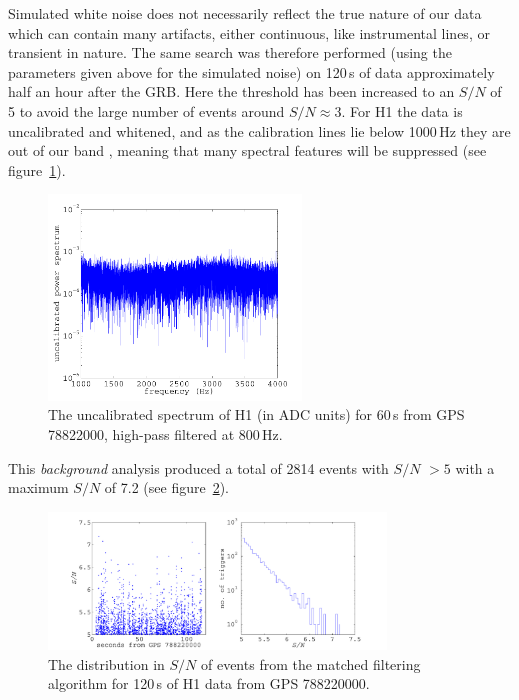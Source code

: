 Simulated white noise does not necessarily reflect the true nature of our data which can contain
many artifacts, either continuous, like instrumental lines, or transient in nature. The same search
was therefore performed (using the parameters given above for the simulated noise) on 120\,s of data
approximately half an hour after the GRB. Here the threshold has been increased to an $S/N$ of 5 to
avoid the large number of events around $S/N \approx 3$. For H1 the data is uncalibrated and
whitened, and as the calibration lines lie below 1000\,Hz they are out of our band
\cite{CalibrationDoc}, meaning that many spectral features will be suppressed (see
figure~\ref{H1SpectrumRingdownSearch}).
\begin{figure}[!htbp]
\begin{center}
\includegraphics[width=0.6\textwidth]{figs/H1SpectrumRingdownSearch}\caption[The uncalibrated
spectrum of H1 (in ADC units) for 60\,s from GPS 78822000.]{The uncalibrated spectrum of H1 (in ADC
units) for 60\,s from GPS 78822000, high-pass filtered at 800\,Hz.}\label{H1SpectrumRingdownSearch}
\end{center}
\end{figure}
This {\it background} analysis produced a total of 2814 events with $S/N$ $> 5$ with a maximum $S/N$
of 7.2 (see figure~\ref{H1RingdownBgSNR}).
\begin{figure}[!htbp]
\begin{center}
\includegraphics[width=0.8\textwidth]{figs/H1RingdownBgSNR}\caption{The distribution
in $S/N$ of events from the matched filtering algorithm for 120\,s of H1 data from GPS 788220000.
}\label{H1RingdownBgSNR}
\end{center}
\end{figure}
